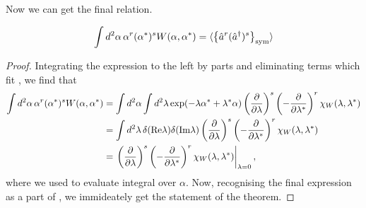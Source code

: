 Now we can get the final relation.
\begin{theorem}
\[
	\int d^2\alpha\, \alpha^r (\alpha^*)^s W(\alpha, \alpha^*)
	= \langle \left\{  \hat{a}^r (\hat{a}^\dagger)^s  \right\}_{\mathrm{sym}} \rangle
\]
\end{theorem}
\begin{proof}
Integrating the expression to the left by parts and eliminating terms which fit , we find that
\begin{equation*}
\begin{split}
	\int d^2\alpha\, \alpha^r (\alpha^*)^s W(\alpha, \alpha^*)
	& = \int d^2\alpha \int d^2\lambda
		\exp(-\lambda \alpha^* + \lambda^* \alpha)
		\left( \frac{\partial}{\partial \lambda} \right)^s
		\left( -\frac{\partial}{\partial \lambda^*} \right)^r
		\chi_W (\lambda, \lambda^*) \\
	& = \int d^2\lambda\,
		\delta (\mathrm{Re} \lambda) \delta (\mathrm{Im} \lambda)
		\left( \frac{\partial}{\partial \lambda} \right)^s
		\left( -\frac{\partial}{\partial \lambda^*} \right)^r
		\chi_W (\lambda, \lambda^*) \\
	& = \left.
		\left( \frac{\partial}{\partial \lambda} \right)^s
		\left( -\frac{\partial}{\partial \lambda^*} \right)^r
		\chi_W (\lambda, \lambda^*)
	\right|_{\lambda=0},
\end{split}
\end{equation*}
where we used  to evaluate integral over $\alpha$.
Now, recognising the final expression as a part of ,
we immideately get the statement of the theorem.
\end{proof}